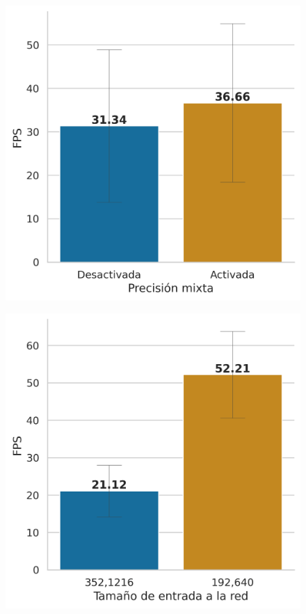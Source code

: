 \begin{figure}
\begin{minipage}{.45\textwidth}
  \centering
  \includegraphics[width=\linewidth]{imagenes/Resultados/mixed_precision.png} 
  \label{fig:resultados-mixed-precision}
\end{minipage}%
\hfill
\begin{minipage}{.45\textwidth}
  \centering
  \includegraphics[width=\linewidth]{imagenes/Resultados/velocidad_inferencia_entrada.png} 

\end{minipage}
\end{figure}
